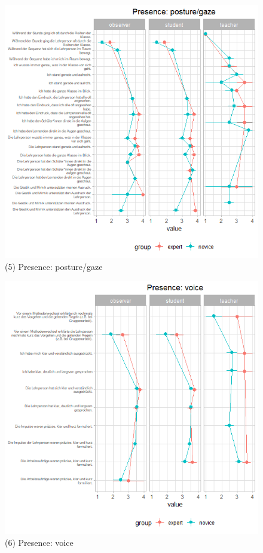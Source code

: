 \documentclass[
  english,
  man,floatsintext]{apa6}
\begin{document}
\begin{figure}

{\centering \includegraphics[width=5.33in]{./pictures/presenceposturegaze} 

}

\caption{(5) Presence: posture/gaze}\label{fig:presenceposturegaze}
\end{figure}

\newpage



\begin{figure}

{\centering \includegraphics[width=5.33in]{./pictures/presencevoice} 

}

\caption{(6) Presence: voice}\label{fig:presencevoice}
\end{figure}
\newpage
\end{document}
